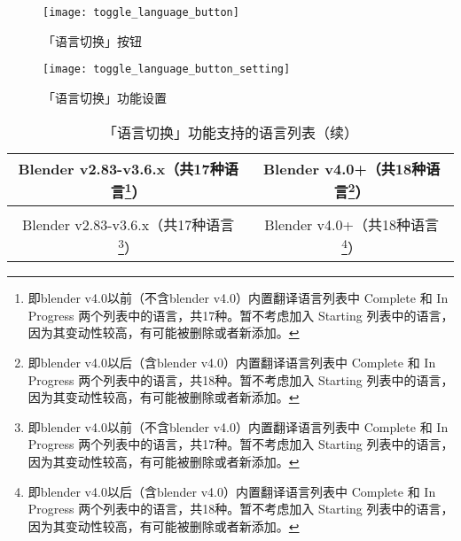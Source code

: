\documentclass{../../public_resources/doc}
\begin{document}
\begin{figure}[h!]
    \begin{minipage}[t]{0.48\linewidth}
        \texttt{[image: toggle\_language\_button]}
        \caption{「语言切换」按钮}
    \end{minipage}
    \quad
    \begin{minipage}[t]{0.48\linewidth}
        \texttt{[image: toggle\_language\_button\_setting]}
        \caption{「语言切换」功能设置}
        \label{「语言切换」功能设置}
    \end{minipage}
\end{figure}

\begin{longtable}{|c|c|}
    \caption{「语言切换」功能支持的语言列表} \\
    \hline
    Blender v2.83-v3.6.x（共17种语言\footnote{即blender v4.0以前（不含blender v4.0）内置翻译语言列表中 Complete 和 In Progress 两个列表中的语言，共17种。暂不考虑加入 Starting 列表中的语言，因为其变动性较高，有可能被删除或者新添加。}） & Blender v4.0+（共18种语言\footnote{即blender v4.0以后（含blender v4.0）内置翻译语言列表中 Complete 和 In Progress 两个列表中的语言，共18种。暂不考虑加入 Starting 列表中的语言，因为其变动性较高，有可能被删除或者新添加。}）  \\
    \hline
    \endfirsthead

    \caption{「语言切换」功能支持的语言列表（续）} \\
    \hline
    Blender v2.83-v3.6.x（共17种语言\footnote{即blender v4.0以前（不含blender v4.0）内置翻译语言列表中 Complete 和 In Progress 两个列表中的语言，共17种。暂不考虑加入 Starting 列表中的语言，因为其变动性较高，有可能被删除或者新添加。}） & Blender v4.0+（共18种语言\footnote{即blender v4.0以后（含blender v4.0）内置翻译语言列表中 Complete 和 In Progress 两个列表中的语言，共18种。暂不考虑加入 Starting 列表中的语言，因为其变动性较高，有可能被删除或者新添加。}） \\
    \hline
    \endhead


\end{longtable}
\end{document}
